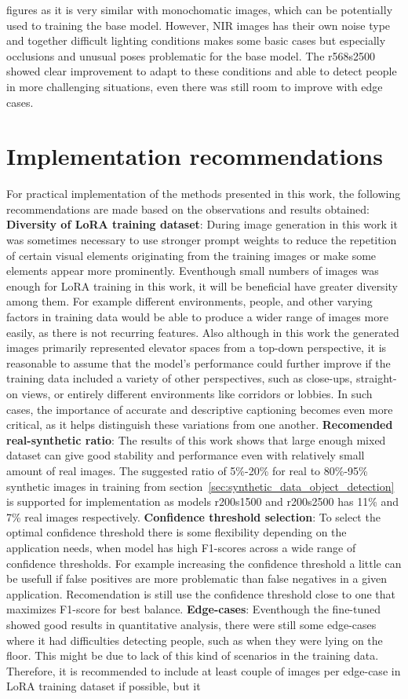 figures as it is very similar with monochomatic images, which can be potentially used to training the base model. However, NIR images has their own noise type and together difficult lighting conditions makes some basic cases but especially occlusions and unusual poses problematic for the base model. The r568s2500 showed clear improvement to adapt to these conditions and able to detect people in more challenging situations, even there was still room to improve with edge cases. \section{Implementation recommendations} For practical implementation of the methods presented in this work, the following recommendations are made based on the observations and results obtained: \textbf{Diversity of LoRA training dataset}: During image generation in this work it was sometimes necessary to use stronger prompt weights to reduce the repetition of certain visual elements originating from the training images or make some elements appear more prominently. Eventhough small numbers of images was enough for LoRA training in this work, it will be beneficial have greater diversity among them. For example different environments, people, and other varying factors in training data would be able to produce a wider range of images more easily, as there is not recurring features. Also although in this work the generated images primarily represented elevator spaces from a top-down perspective, it is reasonable to assume that the model's performance could further improve if the training data included a variety of other perspectives, such as close-ups, straight-on views, or entirely different environments like corridors or lobbies. In such cases, the importance of accurate and descriptive captioning becomes even more critical, as it helps distinguish these variations from one another. \textbf{Recomended real-synthetic ratio}: The results of this work shows that large enough mixed dataset can give good stability and performance even with relatively small amount of real images. The suggested ratio of 5\%-20\% for real to 80\%-95\% synthetic images in training from section~\ref{sec:synthetic_data_object_detection} is supported for implementation as models r200s1500 and r200s2500 has 11\% and 7\% real images respectively. \textbf{Confidence threshold selection}: To select the optimal confidence threshold there is some flexibility depending on the application needs, when model has high F1-scores across a wide range of confidence thresholds. For example increasing the confidence threshold a little can be usefull if false positives are more problematic than false negatives in a given application. Recomendation is still use the confidence threshold close to one that maximizes F1-score for best balance. \textbf{Edge-cases}: Eventhough the fine-tuned showed good results in quantitative analysis, there were still some edge-cases where it had difficulties detecting people, such as when they were lying on the floor. This might be due to lack of this kind of scenarios in the training data. Therefore, it is recommended to include at least couple of images per edge-case in LoRA training dataset if possible, but it 